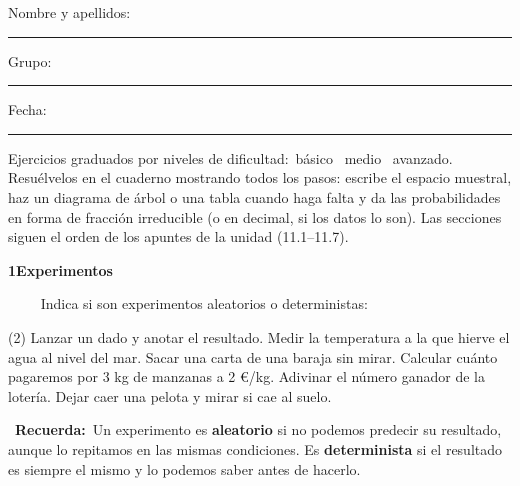 \documentclass[11pt,a4paper]{article}
\newcommand{\estrelles}[1]{{\color{accent}\ifcase#1\or\faStar\faStar[regular]\faStar[regular]\or\faStar\faStar\faStar[regular]\or\faStar\faStar\faStar\fi}}
\newcounter{exer}
\newcommand{\ex}[1]{\par\needspace{4\baselineskip}\medskip\stepcounter{exer}\noindent{\color{navy}\bfseries\theexer.}\ \ {\small\estrelles{#1}}\ \ }
\newcommand{\seccio}[2]{\par\needspace{10\baselineskip}\bigskip
  \begin{tcolorbox}[colback=navy,colframe=navy,coltext=white,arc=2mm,boxrule=0pt,left=3mm,right=3mm,top=1.2mm,bottom=1.2mm]
  {\large\bfseries #1\quad #2}
  \end{tcolorbox}\vspace{-2pt}}
\newcommand{\recorda}[1]{\par\smallskip\begin{tcolorbox}[colback=accent!7,colframe=accent!55,arc=2mm,boxrule=0.5pt,left=2.5mm,right=2.5mm,top=1mm,bottom=1mm]\small{\color{accent}\faLightbulb[regular]}\ \textbf{Recuerda:}\ #1\end{tcolorbox}}
\begin{document}
\thispagestyle{primera}

\vspace{10pt}
Nombre y apellidos: \rule{6.6cm}{0.4pt}\hfill Grupo: \rule{1.6cm}{0.4pt}\hfill Fecha: \rule{2.2cm}{0.4pt}
\vspace{8pt}

\begin{tcolorbox}[colback=soft,colframe=soft,arc=2mm,left=3mm,right=3mm,top=1.5mm,bottom=1.5mm]
\small Ejercicios graduados por niveles de dificultad:\quad \estrelles{1}\ básico \qquad \estrelles{2}\ medio \qquad \estrelles{3}\ avanzado.\\[2pt] Resuélvelos en el cuaderno mostrando todos los pasos: escribe el espacio muestral, haz un diagrama de árbol o una tabla cuando haga falta y da las probabilidades en forma de fracción irreducible (o en decimal, si los datos lo son). Las secciones siguen el orden de los apuntes de la unidad (11.1--11.7).
\end{tcolorbox}

\seccio{1}{Experimentos}

\ex{1} Indica si son experimentos aleatorios o deterministas:\begin{tasks}(2)
  \task Lanzar un dado y anotar el resultado.
  \task Medir la temperatura a la que hierve el agua al nivel del mar.
  \task Sacar una carta de una baraja sin mirar.
  \task Calcular cuánto pagaremos por 3 kg de manzanas a 2 €/kg.
  \task Adivinar el número ganador de la lotería.
  \task Dejar caer una pelota y mirar si cae al suelo.
\end{tasks}\recorda{Un experimento es \textbf{aleatorio} si no podemos predecir su resultado, aunque lo repitamos en las mismas condiciones. Es \textbf{determinista} si el resultado es siempre el mismo y lo podemos saber antes de hacerlo.}
\end{document}
